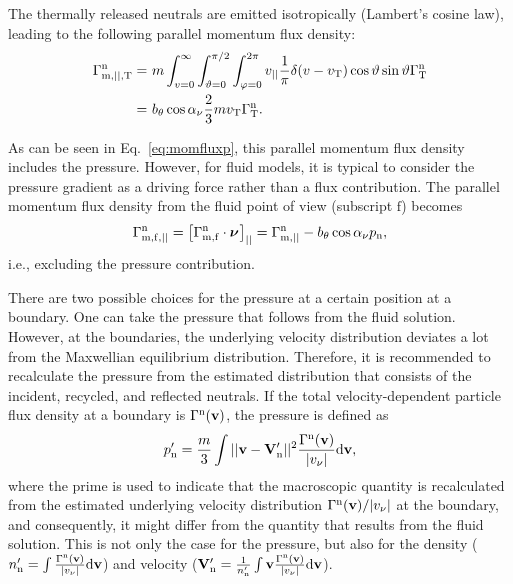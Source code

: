 The thermally released neutrals are emitted isotropically (Lambert's cosine law), leading to the following parallel momentum flux density:
\begin{align}\label{eq:par_momentum_T}
\Gamma_{\mathrm{m},||,\mathrm{T}}^{\mathrm{n}} =& \ m \int_{v=0}^{\infty} \int_{\vartheta = 0}^{\pi/2} \int_{\varphi = 0}^{2\pi} v_{||} \frac{1}{\pi} \delta(v - v_{\mathrm{T}}) \cos \vartheta \sin \vartheta \Gamma_{\mathrm{T}}^{\mathrm{n}} \nonumber \\
=& \ b_{\theta} \cos \alpha_{\nu} \frac{2}{3} m v_{\mathrm{T}} \Gamma_{\mathrm{T}}^{\mathrm{n}}.
\end{align}

As can be seen in Eq.~\eqref{eq:momfluxp}, this parallel momentum flux density includes the pressure. However, for fluid models, it is typical to consider the pressure gradient as a driving force rather than a flux contribution. The parallel momentum flux density from the fluid point of view (subscript $\mathrm{f}$) becomes
\begin{equation}
\Gamma_{\mathrm{m},\mathrm{f},||}^{\mathrm{n}} = \left [\Gamma_{\mathrm{m,f}}^{\mathrm{n}} \cdot {\boldsymbol \nu}_{}\right ]_{||} = \Gamma_{\mathrm{m},||}^{\mathrm{n}} - b_{\theta} \cos \alpha_{\nu} p_{\mathrm{n}}, \label{eq:Gammamompf}
\end{equation}
i.e., excluding the pressure contribution.

There are two possible choices for the pressure at a certain position at a boundary. One can take the pressure that follows from the fluid solution. However, at the boundaries, the underlying velocity distribution deviates a lot from the Maxwellian equilibrium distribution. Therefore, it is recommended to recalculate the pressure from the estimated distribution that consists of the incident, recycled, and reflected neutrals. If the total velocity-dependent particle flux density at a boundary is $\Gamma^{\mathrm{n}}({\bf v})$, the pressure is defined as
\begin{equation}
p_{\mathrm{n}}' = \frac{m}{3} \int ||{\bf v} -{\bf V}_{\mathrm{n}}'||^{2} \frac{\Gamma^{\mathrm{n}}({\bf v})}{|v_{\nu}|} \mathrm{d} {\bf v}, \label{eq:pnboundary}
\end{equation}
where the prime is used to indicate that the macroscopic quantity is recalculated from the estimated underlying velocity distribution $\Gamma^{\mathrm{n}}({\bf v})/|v_{\nu}|$ at the boundary, and consequently, it might differ from the quantity that results from the fluid solution. This is not only the case for the pressure, but also for the density ($n_{\mathrm{n}}' = \int \frac{\Gamma^{\mathrm{n}}({\bf v})}{|v_{\nu}|} \mathrm{d} {\bf v}$) and velocity (${\bf V}_{\mathrm{n}}' = \frac{1}{n_{\mathrm{n}}'}\int {\bf v} \frac{\Gamma^{\mathrm{n}}({\bf v})}{|v_{\nu}|} \mathrm{d} {\bf v}$).

